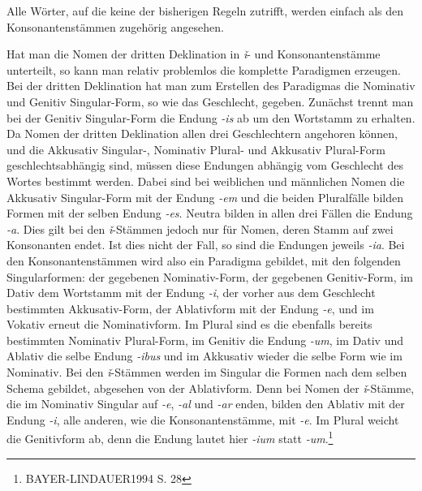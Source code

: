 \documentclass[12pt,abstract=on]{scrreprt}
\begin{document}
Alle Wörter, auf die keine der bisherigen Regeln zutrifft, werden einfach als den Konsonantenstämmen zugehörig angesehen. \par
Hat man die Nomen der dritten Deklination in \textit{ǐ}- und Konsonantenstämme unterteilt, so kann man relativ problemlos die komplette Paradigmen erzeugen. Bei der dritten Deklination hat man zum Erstellen des Paradigmas die Nominativ und Genitiv Singular-Form, so wie das Geschlecht, gegeben. Zunächst trennt man bei der Genitiv Singular-Form die Endung \textit{-is} ab um den Wortstamm zu erhalten. Da Nomen der dritten Deklination allen drei Geschlechtern angehoren können, und die Akkusativ Singular-, Nominativ Plural- und Akkusativ Plural-Form geschlechtsabhängig sind, müssen diese Endungen abhängig vom Geschlecht des Wortes bestimmt werden. Dabei sind bei weiblichen und männlichen Nomen die Akkusativ Singular-Form mit der Endung \textit{-em} und die beiden Pluralfälle bilden Formen mit der selben Endung \textit{-es}. Neutra bilden in allen drei Fällen die Endung \textit{-a}. Dies gilt bei den \textit{ǐ}-Stämmen jedoch nur für Nomen, deren Stamm auf zwei Konsonanten endet. Ist dies nicht der Fall, so sind die Endungen jeweils \textit{-ia}. Bei den Konsonantenstämmen wird also ein Paradigma gebildet, mit den folgenden Singularformen: der gegebenen Nominativ-Form, der gegebenen Genitiv-Form, im Dativ dem Wortstamm mit der Endung \textit{-i}, der vorher aus dem Geschlecht bestimmten Akkusativ-Form, der Ablativform mit der Endung \textit{-e}, und im Vokativ erneut die Nominativform. Im Plural sind es die ebenfalls bereits bestimmten Nominativ Plural-Form, im Genitiv die Endung \textit{-um}, im Dativ und Ablativ die selbe Endung \textit{-ibus} und im Akkusativ wieder die selbe Form wie im Nominativ. Bei den \textit{ǐ}-Stämmen werden im Singular die Formen nach dem selben Schema gebildet, abgesehen von der Ablativform. Denn bei Nomen der \textit{ǐ}-Stämme, die im Nominativ Singular auf \textit{-e}, \textit{-al} und \textit{-ar} enden, bilden den Ablativ mit der Endung \textit{-i}, alle anderen, wie die Konsonantenstämme, mit \textit{-e}. Im Plural weicht die Genitivform ab, denn die Endung lautet hier \textit{-ium} statt \textit{-um}.\footnote{BAYER-LINDAUER1994 S. 28} \par
\end{document}
